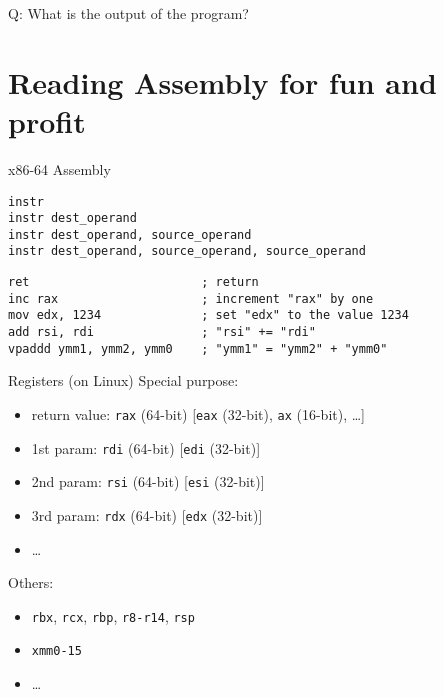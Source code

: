 \begin{frame}[fragile]{Q: What is the output of the program?}
\end{frame}

\section{Reading Assembly for fun and profit}

\begin{frame}[fragile]{x86-64 Assembly}
    \begin{lstlisting}[language={}]
instr
instr dest_operand
instr dest_operand, source_operand
instr dest_operand, source_operand, source_operand
    \end{lstlisting}

    \begin{lstlisting}[language={}]
ret                        ; return
inc rax                    ; increment "rax" by one
mov edx, 1234              ; set "edx" to the value 1234
add rsi, rdi               ; "rsi" += "rdi"
vpaddd ymm1, ymm2, ymm0    ; "ymm1" = "ymm2" + "ymm0"
    \end{lstlisting}
\end{frame}

\begin{frame}{Registers (on Linux)}
    Special purpose:
    \begin{itemize}
        \item return value: \texttt{rax} (64-bit) [\texttt{eax} (32-bit), \texttt{ax} (16-bit), \ldots]
        \item 1st param: \texttt{rdi} (64-bit) [\texttt{edi} (32-bit)]
        \item 2nd param: \texttt{rsi} (64-bit) [\texttt{esi} (32-bit)]
        \item 3rd param: \texttt{rdx} (64-bit) [\texttt{edx} (32-bit)]
        \item \ldots
    \end{itemize}

    Others:
    \begin{itemize}
        \item \texttt{rbx}, \texttt{rcx}, \texttt{rbp}, \texttt{r8-r14}, \texttt{rsp}
        \item \texttt{xmm0-15}
        \item \ldots
    \end{itemize}
\end{frame}

